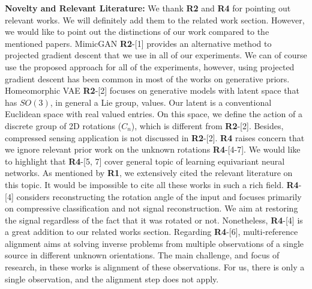 \documentclass{article}
\begin{document}
\textbf{Novelty and Relevant Literature:} We thank \textbf{R2} and \textbf{R4} for pointing out relevant works. We will definitely add them to the related work section.  However, we would like to point out the distinctions of our work compared to the mentioned papers. MimicGAN \textbf{R2}-[1] provides an alternative method to projected gradient descent that we use in all of our experiments. We can of course use the proposed approach for all of the experiments, however, using projected gradient descent has been common in most of the works on generative priors. 
Homeomorphic VAE \textbf{R2}-[2] focuses on generative models with latent space that has $SO(3)$, in general a Lie group, values. Our latent is a conventional Euclidean space with real valued entries. On this space, we define the action of a discrete group of 2D rotations ($C_n$), which is different from \textbf{R2}-[2]. Besides, compressed sensing application is not discussed in \textbf{R2}-[2].
\textbf{R4} raises concern that we ignore relevant prior work on the unknown rotations \textbf{R4}-[4-7]. We would like to highlight that \textbf{R4}-[5, 7] cover general topic of learning equivariant neural networks. As  mentioned by \textbf{R1}, we extensively cited the relevant literature on this topic. It would be impossible to cite all these works in such a rich field.  \textbf{R4}-[4] considers reconstructing the rotation angle of the input and focuses primarily on compressive classification and not signal reconstruction. We aim at restoring the signal regardless of the fact that it was rotated or not. Nonetheless, \textbf{R4}-[4] is a great addition to our related works section. Regarding \textbf{R4}-[6], multi-reference alignment aims at solving inverse problems from multiple observations of a single source in different unknown orientations. The main challenge, and focus of research, in these works is alignment of these observations.
For us, there is only a single observation, and the alignment step does not apply.
\end{document}
